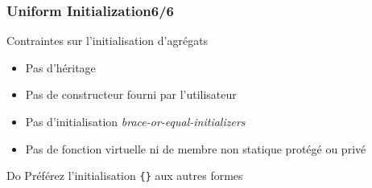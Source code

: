 \documentclass[C++.tex]{subfiles}
\begin{document}
\begin{frame}[fragile]
	\frametitle{Uniform Initialization\titlehfill{}6/6}
	\begin{alertblock}{Contraintes sur l'initialisation d'agrégats}
		\begin{itemize}
			\item Pas d'héritage
			\item Pas de constructeur fourni par l'utilisateur
			\item Pas d'initialisation \textit{brace-or-equal-initializers}
			\item Pas de fonction virtuelle ni de membre non statique protégé ou privé
		\end{itemize}

	\end{alertblock}

	\begin{exampleblock}{Do}
		Préférez l'initialisation \lstinline|{}| aux autres formes
	\end{exampleblock}
\end{frame}
\end{document}
